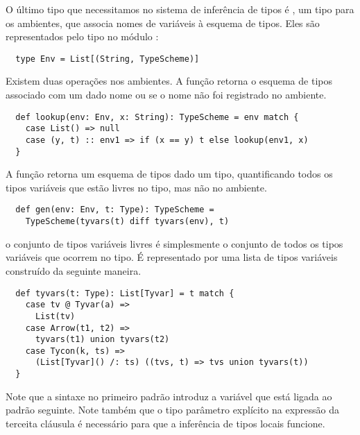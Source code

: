 O último tipo que necessitamos no sistema de inferência de tipos é 
, um tipo para os ambientes, que associa nomes de variáveis à esquema de tipos. 
Eles são representados pelo tipo  no módulo :
\begin{lstlisting}
  type Env = List[(String, TypeScheme)]
\end{lstlisting}
Existem duas operações nos ambientes. A função   
retorna o esquema de tipos associado com um dado nome ou 
se o nome não foi registrado no ambiente.
\begin{lstlisting}
  def lookup(env: Env, x: String): TypeScheme = env match {
    case List() => null
    case (y, t) :: env1 => if (x == y) t else lookup(env1, x)
  }
\end{lstlisting}
A função  retorna um esquema de tipos dado um tipo,
quantificando todos os tipos variáveis que estão livres no tipo, mas
não no ambiente.
\begin{lstlisting}
  def gen(env: Env, t: Type): TypeScheme = 
    TypeScheme(tyvars(t) diff tyvars(env), t)
\end{lstlisting}
o conjunto de tipos variáveis livres é simplesmente o conjunto de todos
os tipos variáveis que ocorrem no tipo. É representado por uma lista de tipos
variáveis construído da seguinte maneira.
\begin{lstlisting}
  def tyvars(t: Type): List[Tyvar] = t match {
    case tv @ Tyvar(a) => 
      List(tv)
    case Arrow(t1, t2) => 
      tyvars(t1) union tyvars(t2)
    case Tycon(k, ts) => 
      (List[Tyvar]() /: ts) ((tvs, t) => tvs union tyvars(t))
  }
\end{lstlisting}
Note que a sintaxe  no primeiro padrão introduz a variável 
que está ligada ao padrão seguinte. 
Note também que o tipo parâmetro \code{[Tyvar]} explícito na expressão da terceita cláusula é necessário para
que a inferência de tipos locais funcione.


